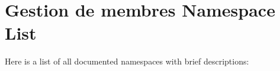 \section{Gestion de membres Namespace List}
Here is a list of all documented namespaces with brief descriptions:\begin{CompactList}
\item{}
\end{CompactList}
